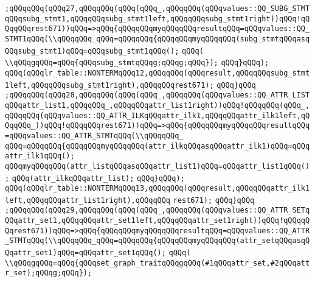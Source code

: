 \verb|;qQQqqQQq(qQQq27,qQQqqQQq(qQQq(qQQq_,qQQqqQQq(qQQqvalues::QQ_SUBG_STMTqQQqsubg_stmt1,qQQqqQQqsubg_stmt1left,qQQqqQQqsubg_stmt1right))qQQq!qQQqqQQqrest671))qQQq=>qQQq{qQQqqQQqmyqQQqqQQqresultqQQq=qQQqvalues::QQ_STMT1qQQq(\\qQQqqQQq_qQQq=qQQqqQQq{qQQqqQQqmyqQQqqQQq(subg_stmtqQQqasqQQqsubg_stmt1)qQQq=qQQqsubg_stmt1qQQq();|\newline
\verb|qQQq(|\newline
\verb|\\qQQqgqQQq=qQQq{qQQqsubg_stmtqQQqg;qQQqg;qQQq});|\newline
\verb|qQQq}qQQq);|\newline
\verb|qQQq(qQQqlr_table::NONTERMqQQq12,qQQqqQQq(qQQqresult,qQQqqQQqsubg_stmt1left,qQQqqQQqsubg_stmt1right),qQQqqQQqrest671);|\newline
\verb|qQQq}qQQq|\newline
\verb|;qQQqqQQq(qQQq28,qQQqqQQq(qQQq(qQQq_,qQQqqQQq(qQQqvalues::QQ_ATTR_LISTqQQqattr_list1,qQQqqQQq_,qQQqqQQqattr_list1right))qQQq!qQQqqQQq(qQQq_,qQQqqQQq(qQQqvalues::QQ_ATTR_ILKqQQqattr_ilk1,qQQqqQQqattr_ilk1left,qQQqqQQq_))qQQq!qQQqqQQqrest671))qQQq=>qQQq{qQQqqQQqmyqQQqqQQqresultqQQq=qQQqvalues::QQ_ATTR_STMTqQQq(\\qQQqqQQq_|\newline
\verb|qQQq=qQQqqQQq{qQQqqQQqmyqQQqqQQq(attr_ilkqQQqasqQQqattr_ilk1)qQQq=qQQqattr_ilk1qQQq();|\newline
\verb|qQQqmyqQQqqQQq(attr_listqQQqasqQQqattr_list1)qQQq=qQQqattr_list1qQQq();|\newline
\verb|qQQq(attr_ilkqQQqattr_list);|\newline
\verb|qQQq}qQQq);|\newline
\verb|qQQq(qQQqlr_table::NONTERMqQQq13,qQQqqQQq(qQQqresult,qQQqqQQqattr_ilk1left,qQQqqQQqattr_list1right),qQQqqQQq|\newline
\verb|rest671);|\newline
\verb|qQQq}qQQq|\newline
\verb|;qQQqqQQq(qQQq29,qQQqqQQq(qQQq(qQQq_,qQQqqQQq(qQQqvalues::QQ_ATTR_SETqQQqattr_set1,qQQqqQQqattr_set1left,qQQqqQQqattr_set1right))qQQq!qQQqqQQqrest671))qQQq=>qQQq{qQQqqQQqmyqQQqqQQqresultqQQq=qQQqvalues::QQ_ATTR_STMTqQQq(\\qQQqqQQq_qQQq=qQQqqQQq{qQQqqQQqmyqQQqqQQq(attr_setqQQqasqQQqattr_set1)qQQq=qQQqattr_set1qQQq();|\newline
\verb|qQQq(|\newline
\verb|\\qQQqgqQQq=qQQq{qQQqset_graph_traitqQQqgqQQq(#1qQQqattr_set,#2qQQqattr_set);qQQqg;qQQq});|\newline

